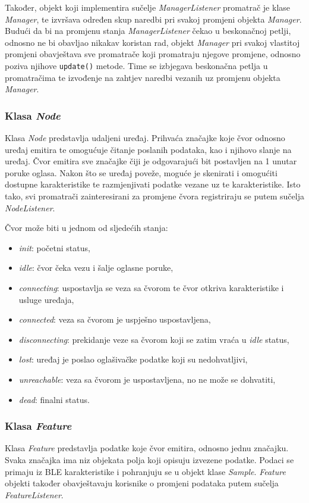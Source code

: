 Također, objekt koji implementira sučelje \textit{ManagerListener} promatrač je klase \textit{Manager}, te izvršava određen skup naredbi pri svakoj promjeni objekta \textit{Manager}. Budući da bi na promjenu stanja \textit{ManagerListener} čekao u beskonačnoj petlji, odnosno ne bi obavljao nikakav koristan rad, objekt \textit{Manager} pri svakoj vlastitoj promjeni obavještava sve promatrače koji promatraju njegove promjene, odnosno poziva njihove \lstinline|update()| metode. Time se izbjegava beskonačna petlja u promatračima te izvođenje na zahtjev naredbi vezanih uz promjenu objekta \textit{Manager}.


\subsubsection{Klasa \textit{Node}}
Klasa \textit{Node} predstavlja udaljeni uređaj. Prihvaća značajke koje čvor odnosno uređaj emitira te omogućuje čitanje poslanih podataka, kao i njihovo slanje na uređaj. Čvor emitira sve značajke čiji je odgovarajući bit postavljen na 1 unutar poruke oglasa. Nakon što se uređaj poveže, moguće je skenirati i omogućiti dostupne karakteristike te razmjenjivati podatke vezane uz te karakteristike. Isto tako, svi promatrači zainteresirani za promjene čvora registriraju se putem sučelja \textit{NodeListener}.

Čvor može biti u jednom od sljedećih stanja:
\begin{itemize}
	\item \textit{init}: početni status,
	\item \textit{idle}: čvor čeka vezu i šalje oglasne poruke,
	\item \textit{connecting}: uspostavlja se veza sa čvorom te čvor otkriva karakteristike i usluge uređaja,
	\item \textit{connected}: veza sa čvorom je uspješno uspostavljena, 
	\item \textit{disconnecting}: prekidanje veze sa čvorom koji se zatim vraća u \textit{idle} status, 
	\item \textit{lost}: uređaj je poslao oglašivačke podatke koji su nedohvatljivi,
	\item \textit{unreachable}: veza sa čvorom je uspostavljena, no ne može se dohvatiti, 
	\item \textit{dead}: finalni status.
\end{itemize}

\subsubsection{Klasa \textit{Feature}}
Klasa \textit{Feature} predstavlja podatke koje čvor emitira, odnosno jednu značajku. Svaka značajka ima niz objekata polja koji opisuju izvezene podatke. Podaci se primaju iz BLE karakteristike i pohranjuju se u objekt klase \textit{Sample}. \textit{Feature} objekti također obavještavaju korisnike o promjeni podataka putem sučelja \textit{FeatureListener}.


